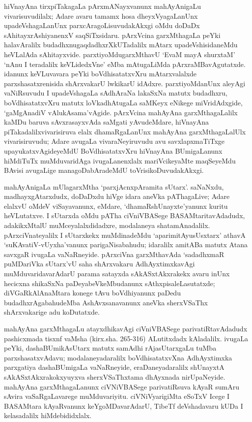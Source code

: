 hiVnayAna tirxpiTakagaLa pArxmANayxvanunx mahAyAnigaLu vivarisuvudilalx; Adare avaru tamamx hosa dheyxVyagaLanUnx upadeVshagaLanUnx parxcAragoLisuvudakAkxgi oMdu doDaDx sAhitayxrAshiyanenxV saqSiTxsidaru. pArxVcina garxMthagaLa peYki halavAralilx  \hbox{budadhxnu}\break gaqdadhxrX\-kUTadalilx mAtarx upadeVshisidaneMdu heVLalAda sAhitayxvide. parxtiyoMdu\break garxMthavU `EvaM mayA shurxtaM' `nAnu I teradalilx keVLidedxVne' eMba mAtugaLiMda pArxraMBavAgutatxde. idanunx keVLuvavara peYki boVdhisatatxvXru mAtarxvalalxde parxshasatxrenisida shArxvakarU lwkikarU idAdxre. parxtiyoMdanUnx aleyAgi vaNiRsuvudu I upa\-deVshagaLa sAdhAraNa lakaSxNa matutx budadhxru, boVdhisatatxvXru matutx loVkadhAtugaLa saMKeyx eNikege miVridAdxgide, `gaMgAnadiV vAlukAsama'vAgide. pArxVcina mahAyAna garxMtha\break\-gaLalilx kaMDu baruva  sAvxrasayxvAda saMgati yAvudeMdare, hiVnayAna piTakadalilx\break vivarisiruva elalx dhamaRgaLanUnx mahAyAna garxMthagaLalUlx vivarisiruvudu; Adare avugaLa vivaraNeyiruvudu avu savxlapxmaTiTxge upayukatxvAgideyeMdU BoVdhi\-satatxvXru hiVnayAna BUmigaLanunx hiMdiTuTx muMduvaridAga ivugaLanenxlalx mariVcikeyaMte maqSeyeMdu BAvisi avugaLige managoDabAradeMdU toVrisikoDuvudakAkxgi.

mahAyAnigaLa mUlagarxMtha `parxjAcnxpAramita sUtarx'. saNaNxdu, madhayxgAtarxdudx, doDaDxdu hiVge idara aneVka pAThagaLive; Adare elalxvU oMdeV viSayavanunx, eMdare, `dhamaRshUnayxte'yanunx kuritu heVLutatxve. I sUtarxda oMdu pATha ciVniVBASege BASAMtaritavAdadudx, adakikxMtalU muMceyalalxdidadxre, modalaneya shatamAnadalilx. pArxciVnateyalilx I sUtarxkekx muMdinadeMdu `aparimitAyusUsxtarx' athavA `suKAvatiV-vUyxha'vanunx parigaNisabahudu; idaralilx amitABa matutx Atana savxgaR ivugaLa vaNaRneyide. pArxciVna garxMthavAda `sadadhxmaR puMDariVka sUtarx'vU saha shArxvakaru AdhAyxtimxkavAgi muMduvaridavarAdarU parama satayxda sAkASxtAkxrakekx avaru inUnx hecicxna shikaSxNa paDeyabeVkeMbudanunx sAthxpisaleLasutatxde; diVGaRkAlAnaMtara konege tAvu boVdhiyanunx paDedu budadhxrAgabahudeMba AshAvxsanavanunx aneVka sherxVSaThx shArxvakarige adu koDutatxde.

mahAyAna garxMthagaLu atayxdhikavAgi ciVniVBASege parivatiRtavAdadudx pashicxmada tisxnf vaMsha (kirx.sha. 265-316) ALutitxdadx kAladalilx. ivugaLa peYki, dashaBUmikA\-sUtarx matutx samAdhi rAjasUtarxgaLu tuMba parxshasatxvAdavu; modalaneyadaralilx boVdhisatatxvXna AdhAyxtimxka parxgatiya dashaBUmigaLa vaNaRneyide, eraDaneyadaralilx shUnayxtA sAkASxtAkxrakokxyuyxva sherxVSaThxtama dhAyxnada nirUpaNeyide. mahAyAna garxMthagaLanunx ciVNiVBASege parivatiRsuva kAyaR sumAru sAvira vaSaRgaLavarege muMduvariyitu. ciVNiVyarigiMta eSoTxV Icege I BASAMtara kAyaRvanunx keYgoMDavarAdarU, TibeTf deVshadavaru kUDa I kelasadalilx hiMdebididxlalx.

